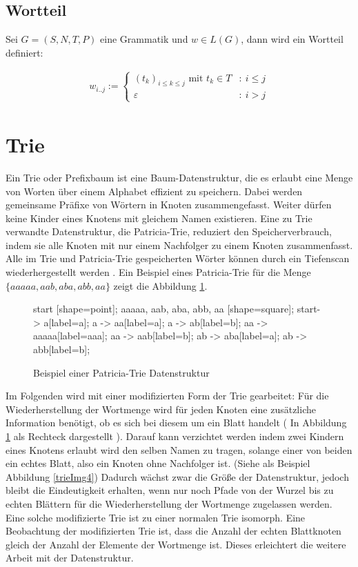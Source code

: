 \documentclass[a4paper,12pt]{report}
\begin{document}
\subsection*{Wortteil}

Sei $G=(S,N,T,P)$ eine Grammatik und $w\in L(G)$, dann wird ein Wortteil definiert: 

\begin{eqnarray}
  w_{i..j} := 
  \begin{cases}
    (t_k)_{i\leq k \leq j}\text{ mit }t_k\in T &:\ i\leq j \\
    \varepsilon &:\ i>j
  \end{cases}
\end{eqnarray}

\section{Trie}
\label{trie}

Ein Trie oder Prefixbaum ist eine Baum-Datenstruktur, die es erlaubt eine Menge von Worten über einem Alphabet effizient zu speichern. Dabei werden gemeinsame Präfixe von Wörtern in Knoten zusammengefasst. Weiter dürfen keine Kinder eines Knotens mit gleichem Namen existieren. 
Eine zu Trie verwandte Datenstruktur, die Patricia-Trie, reduziert den Speicherverbrauch, indem sie alle Knoten mit nur einem Nachfolger zu einem Knoten zusammenfasst.
Alle im Trie und Patricia-Trie gespeicherten Wörter können durch ein Tiefenscan wiederhergestellt werden \cite{Morrison1968}.
Ein Beispiel eines Patricia-Trie für die Menge $\{ aaaaa, aab, aba, abb, aa \}$ zeigt die Abbildung \ref{trieImg}.

\begin{figure}[ht]
    \centering
    {
      start [shape=point];
      aaaaa, aab, aba, abb, aa [shape=square];
      start-> a[label=a];
      a -> aa[label=a];
      a -> ab[label=b];
      aa -> aaaaa[label=aaa];
      aa -> aab[label=b];
      ab -> aba[label=a];
      ab -> abb[label=b];
    }
    \caption{Beispiel einer Patricia-Trie Datenstruktur}
    \label{trieImg}
\end{figure}

Im Folgenden wird mit einer modifizierten Form der Trie gearbeitet: 
Für die Wiederherstellung der Wortmenge wird für jeden Knoten eine zusätzliche Information benötigt, ob es sich bei diesem um ein Blatt handelt ( In Abbildung \ref{trieImg} als Rechteck dargestellt ). 
Darauf kann verzichtet werden indem zwei Kindern eines Knotens erlaubt wird den selben Namen zu tragen, solange einer von beiden ein echtes Blatt, also ein Knoten ohne Nachfolger ist. (Siehe als Beispiel Abbildung \ref{trieImg4})
Dadurch wächst zwar die Größe der Datenstruktur, jedoch bleibt die Eindeutigkeit erhalten, wenn nur noch Pfade von der Wurzel bis zu echten Blättern für die Wiederherstellung der Wortmenge zugelassen werden.
Eine solche modifizierte Trie ist zu einer normalen Trie isomorph.
Eine Beobachtung der modifizierten Trie ist, dass die Anzahl der echten Blattknoten gleich der Anzahl der Elemente der Wortmenge ist. Dieses erleichtert die weitere Arbeit mit der Datenstruktur.
\end{document}
